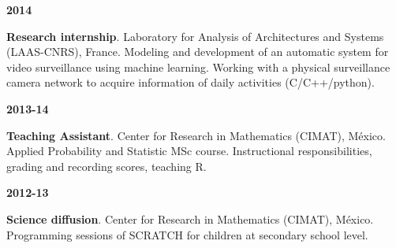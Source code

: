 \documentclass[10 pt]{article}
\begin{document}
\begin{minipage}[t][1.1cm]{0.1\textwidth}

\hspace{-.5cm}\textbf{2014}

\end{minipage}\begin{minipage}[t][1.4cm]{0.87\textwidth}

\textbf{Research internship}. Laboratory for Analysis of Architectures and Systems (LAAS-CNRS), France. 
Modeling and development of an automatic system for video surveillance using machine learning. 
Working with a physical surveillance camera network to acquire information of daily activities 
(C/C++/python).

\end{minipage}
\medskip

\begin{minipage}[t][.7cm]{0.1\textwidth}

\hspace{-.5cm}\textbf{2013-14}

\end{minipage}\begin{minipage}[t][.7cm]{0.87\textwidth}

\textbf{Teaching Assistant}. Center for Research in Mathematics (CIMAT), México.
Applied Probability and Statistic MSc course.
Instructional responsibilities, grading and recording scores, teaching R.

\end{minipage}
\medskip

%
%
%
%

\begin{minipage}[t][.7cm]{0.1\textwidth}

\hspace{-.5cm}\textbf{2012-13}

\end{minipage}\begin{minipage}[t][.7cm]{0.87\textwidth}

\textbf{Science diffusion}. Center for Research in Mathematics (CIMAT), México.
Programming sessions of SCRATCH for children at secondary school level.

\end{minipage}
\medskip
\end{document}
